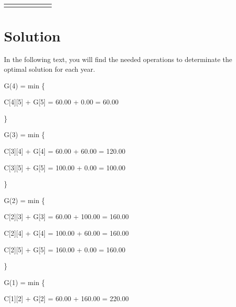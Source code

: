 \documentclass{article}
\begin{document}
\begin{center}
\begin{adjustbox}{max width=\textwidth}
\begin{tabular}{|c||c|c|c|c|c|c|}
        \hline
        \cellcolor{DonCangrejo}{\textbf{\textcolor{white}{i=4}}}& \cellcolor{CangrejoInside}{$-$} & \cellcolor{CangrejoInside}{$-$} & \cellcolor{CangrejoInside}{$-$} & \cellcolor{CangrejoInside}{$-$} & \cellcolor{CangrejoInside}{$-$} & \cellcolor{CangrejoInside}{$60.00$ \$}\\
        \hline
        \cellcolor{DonCangrejo}{\textbf{\textcolor{white}{i=5}}}& \cellcolor{CangrejoInside}{$-$} & \cellcolor{CangrejoInside}{$-$} & \cellcolor{CangrejoInside}{$-$} & \cellcolor{CangrejoInside}{$-$} & \cellcolor{CangrejoInside}{$-$} & \cellcolor{CangrejoInside}{$-$} \\
        \hline
    \end{tabular}
\end{adjustbox}


\end{center}



\section{Solution}
In the following text, you will find the needed operations to determinate the optimal solution for each year.

G(4) = min \{ 

\hspace{1cm} C[4][5] + G[5] = 60.00 + 0.00 = 60.00 

 \} 


G(3) = min \{ 

\hspace{1cm} C[3][4] + G[4] = 60.00 + 60.00 = 120.00 

\hspace{1cm} C[3][5] + G[5] = 100.00 + 0.00 = 100.00 

 \} 


G(2) = min \{ 

\hspace{1cm} C[2][3] + G[3] = 60.00 + 100.00 = 160.00 

\hspace{1cm} C[2][4] + G[4] = 100.00 + 60.00 = 160.00 

\hspace{1cm} C[2][5] + G[5] = 160.00 + 0.00 = 160.00 

 \} 


G(1) = min \{ 

\hspace{1cm} C[1][2] + G[2] = 60.00 + 160.00 = 220.00 
\end{document}

